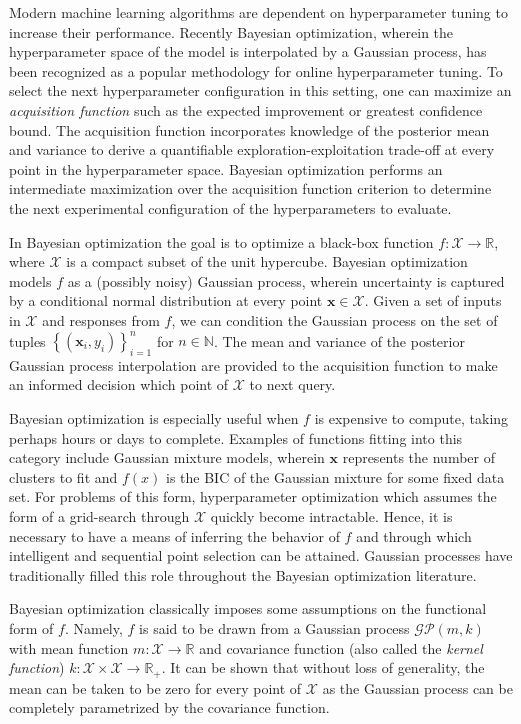 \documentclass[]{article}
\newcommand{\paren}[1]{\left({#1}\right)}
\newcommand{\set}[1]{\left\{{#1}\right\}}
\newcommand{\R}{\mathbb{R}}
\newcommand{\1}{\mathbf{1}}
\newcommand{\0}{\mathbf{0}}
\newcommand{\X}{\mathcal{X}}
\newcommand{\x}{\mathbf{x}}
\begin{document}
Modern machine learning algorithms are dependent on hyperparameter tuning to increase their performance. Recently Bayesian optimization, wherein the hyperparameter space of the model is interpolated by a Gaussian process, has been recognized as a popular methodology for online hyperparameter tuning. To select the next hyperparameter configuration in this  setting, one can maximize an \textit{acquisition function} such as the expected improvement or greatest confidence bound. The acquisition function incorporates knowledge of the posterior mean and variance to derive a quantifiable exploration-exploitation trade-off at every point in the hyperparameter space. Bayesian optimization performs an intermediate maximization over the acquisition function criterion to determine the next experimental configuration of the hyperparameters to evaluate.

In Bayesian optimization the goal is to optimize a black-box function $f:\X\to \R$, where $\X$ is a compact subset of the unit hypercube. Bayesian optimization models $f$ as a (possibly noisy) Gaussian process, wherein uncertainty is captured by a conditional normal distribution at every point $\x\in\X$. Given a set of inputs in $\X$ and responses from $f$, we can condition the Gaussian process on the set of tuples $\set{\paren{\x_i,y_i}}_{i=1}^n$ for $n\in\mathbb{N}$. The mean and variance of the posterior Gaussian process interpolation are provided to the acquisition function to make an informed decision which point of $\X$ to next query.

Bayesian optimization is especially useful when $f$ is expensive to compute, taking perhaps hours or days to complete. Examples of functions fitting into this category include Gaussian mixture models, wherein $\x$ represents the number of clusters to fit and $f\paren{x}$ is the BIC of the Gaussian mixture for some fixed data set. For problems of this form, hyperparameter optimization which assumes the form of a grid-search through $\X$ quickly become intractable. Hence, it is necessary to have a means of inferring the behavior of $f$ and through which intelligent and sequential point selection can be attained. Gaussian processes have traditionally filled this role throughout the Bayesian optimization literature.

Bayesian optimization classically imposes some assumptions on the functional form of $f$. Namely, $f$ is said to be drawn from a Gaussian process $\mathcal{G}\mathcal{P}\paren{m, k}$ with mean function $m : \X\to\R$ and covariance function (also called the \textit{kernel function}) $k : \X\times\X \to\R_+$. It can be shown that without loss of generality, the mean can be taken to be zero for every point of $\X$ as the Gaussian process can be completely parametrized by the covariance function. 
\end{document}
